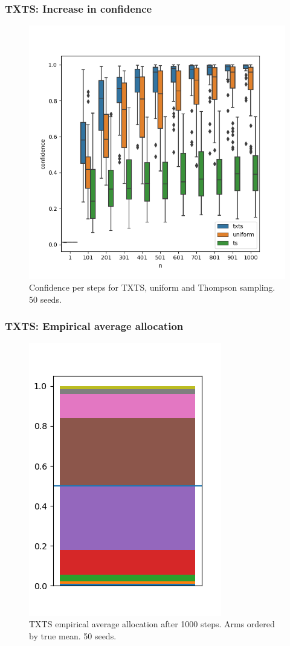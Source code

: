 \documentclass[aspectratio=43]{beamer}
\begin{document}
\begin{frame}
\frametitle{TXTS: Increase in confidence}
\begin{figure}[h]
  \centering
  \includegraphics[width=.55\textwidth]{190723-confidences.png}
  \caption{Confidence per steps for TXTS, uniform and Thompson sampling. 50
      seeds.}
\end{figure}
\end{frame}

\begin{frame}
\frametitle{TXTS: Empirical average allocation}
\begin{figure}[h]
  \centering
  \includegraphics[width=.35\textwidth]{190723-selections_2.png}
  \caption{TXTS empirical average allocation after 1000 steps. Arms ordered by true mean. 50 seeds.}
\end{figure}
\end{frame}

\begin{frame}
\end{frame}
\end{document}
